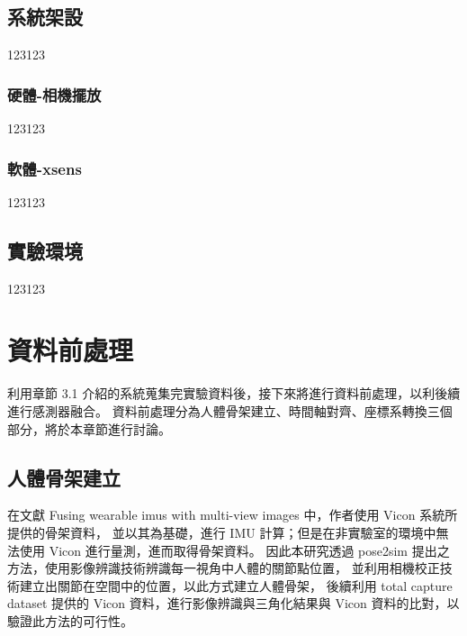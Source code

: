 \subsection{系統架設}
123123
\subsubsection{硬體-相機擺放}
123123
\subsubsection{軟體-xsens}
123123

\subsection{實驗環境}
123123

\section{資料前處理}
利用章節 3.1 介紹的系統蒐集完實驗資料後，接下來將進行資料前處理，以利後續進行感測器融合。
資料前處理分為人體骨架建立、時間軸對齊、座標系轉換三個部分，將於本章節進行討論。

\subsection{人體骨架建立}
在文獻 Fusing wearable imus with multi-view images 中，作者使用 Vicon 系統所提供的骨架資料，
並以其為基礎，進行 IMU 計算；但是在非實驗室的環境中無法使用 Vicon 進行量測，進而取得骨架資料。
因此本研究透過 pose2sim 提出之方法，使用影像辨識技術辨識每一視角中人體的關節點位置，
並利用相機校正技術建立出關節在空間中的位置，以此方式建立人體骨架，
後續利用 total capture dataset 提供的 Vicon 資料，進行影像辨識與三角化結果與 Vicon 資料的比對，以驗證此方法的可行性。

